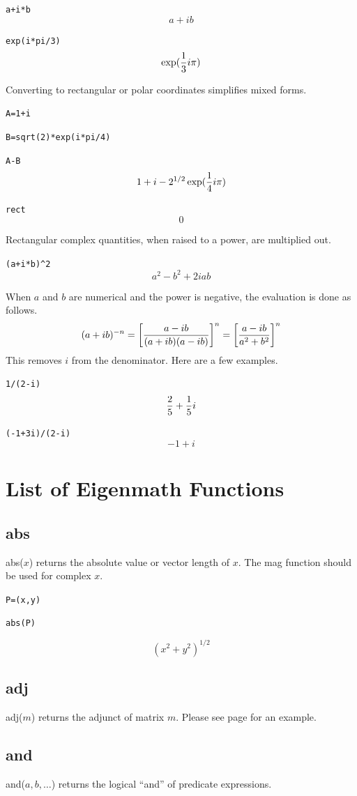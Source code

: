 \documentclass[12pt]{book}
\begin{document}
\medskip
\verb$a+i*b$
$$a+ib$$

\verb$exp(i*pi/3)$
$$\exp({1\over3}i\pi)$$

\medskip
\noindent
Converting to rectangular or polar coordinates simplifies mixed forms.

\medskip
\verb$A=1+i$

\verb$B=sqrt(2)*exp(i*pi/4)$

\verb$A-B$
$$1+i-2^{1/2}\exp({1\over4}i\pi)$$

\verb$rect$
$$0$$

\newpage

\noindent
Rectangular complex quantities, when raised to a power, are multiplied out.

\medskip
\verb$(a+i*b)^2$
$$a^2-b^2+2iab$$

\medskip
\noindent
When $a$ and $b$ are numerical and the power is negative, the evaluation is done as follows.
$$(a+ib)^{-n}=\left[{a-ib\over(a+ib)(a-ib)}\right]^n=\left[{a-ib\over a^2+b^2}\right]^n$$
This removes $i$ from the denominator.
Here are a few examples.

\medskip
\verb$1/(2-i)$
$${2\over5}+{1\over5}i$$

\verb$(-1+3i)/(2-i)$
$$-1+i$$

\newpage

\chapter{List of Eigenmath Functions}

\section*{abs}
abs($x$) returns the absolute value or vector length of $x$.
The mag function should be used for complex $x$.

\medskip
{\tt P=(x,y)}

{\tt abs(P)}

$$(x^2+y^2)^{1/2}$$

\section*{adj}
adj($m$) returns the adjunct of matrix $m$.
Please see page \pageref{adj} for an example.

\section*{and}
and($a,b,\ldots$) returns the logical ``and'' of predicate expressions.
\end{document}
